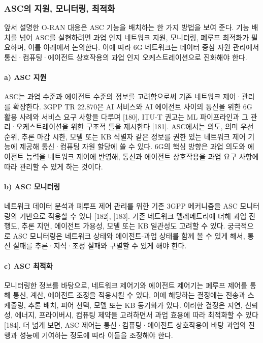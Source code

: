 \subsubsection{ASC의 지원, 모니터링, 최적화}
앞서 설명한 O-RAN 대응은 ASC 기능을 배치하는 한 가지 방법을 보여 준다. 기능 배치를 넘어 ASC를 실현하려면 과업 인지 네트워크 지원, 모니터링, 폐루프 최적화가 필요하며, 이를 아래에서 논의한다. 이에 따라 6G 네트워크는 데이터 중심 자원 관리에서 통신·컴퓨팅·에이전트 상호작용의 과업 인지 오케스트레이션으로 진화해야 한다.

\paragraph{a) ASC 지원}
ASC는 과업 수준과 에이전트 수준의 정보를 고려함으로써 기존 네트워크 제어·관리를 확장한다. 3GPP TR 22.870은 AI 서비스와 AI 에이전트 사이의 통신을 위한 6G 활용 사례와 서비스 요구 사항을 다루며 [180], ITU-T 권고는 ML 파이프라인과 그 관리·오케스트레이션을 위한 구조적 틀을 제시한다 [181]. ASC에서는 의도, 의미 우선순위, 추론 마감 시한, 모델 또는 KB 식별자 같은 정보를 권한 있는 네트워크 제어 기능에 제공해 통신·컴퓨팅 자원 할당에 쓸 수 있다. 6G의 핵심 방향은 과업 의도와 에이전트 능력을 네트워크 제어에 반영해, 통신과 에이전트 상호작용을 과업 요구 사항에 따라 관리할 수 있게 하는 것이다.

\paragraph{b) ASC 모니터링}
네트워크 데이터 분석과 폐루프 제어 관리를 위한 기존 3GPP 메커니즘을 ASC 모니터링의 기반으로 적용할 수 있다 [182], [183]. 기존 네트워크 텔레메트리에 더해 과업 진행도, 추론 지연, 에이전트 가용성, 모델 또는 KB 일관성도 고려할 수 있다. 궁극적으로 ASC 모니터링은 네트워크 상태와 에이전트-과업 상태를 함께 볼 수 있게 해서, 통신 실패를 추론·지식·조정 실패와 구별할 수 있게 해야 한다.

\paragraph{c) ASC 최적화}
모니터링한 정보를 바탕으로, 네트워크 제어기와 에이전트 제어기는 폐루프 제어를 통해 통신, 계산, 에이전트 조정을 적응시킬 수 있다. 이에 해당하는 결정에는 전송과 스케줄링, 추론 배치, 피어 선택, 모델 또는 KB 동기화가 있다. 이러한 결정은 지연, 신뢰성, 에너지, 프라이버시, 컴퓨팅 제약을 고려하면서 과업 효용에 따라 최적화할 수 있다 [184]. 더 넓게 보면, ASC 제어는 통신·컴퓨팅·에이전트 상호작용이 바탕 과업의 진행과 성능에 기여하는 정도에 따라 이들을 조정해야 한다.

